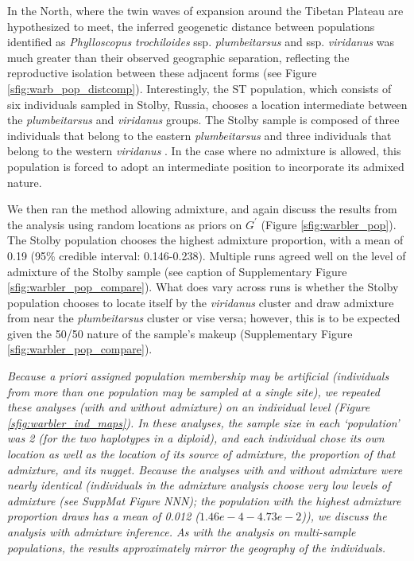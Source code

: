\documentclass[12pt]{article}
\newcommand{\gb}[1]{{\em \color{magenta} #1}}
\begin{document}
In the North, where the twin waves of expansion around the Tibetan Plateau are hypothesized to meet, the inferred geogenetic distance between populations identified as \textit{Phylloscopus trochiloides} ssp. \textit{plumbeitarsus} and ssp. \textit{viridanus} was much greater than their observed geographic separation, reflecting the reproductive isolation between these adjacent forms (see Figure \ref{sfig:warb_pop_distcomp}).  Interestingly, the ST population, which consists of six individuals sampled in Stolby, Russia, chooses a location intermediate between the \textit{plumbeitarsus} and \textit{viridanus} groups. The Stolby sample is composed of three individuals that belong to the eastern \textit{plumbeitarsus} and three individuals that belong to the western \textit{viridanus} \cite{Alcaide et al (2014)}. In the case where no admixture is allowed, this population is forced to adopt an intermediate position to incorporate its admixed nature.


We then ran the method allowing admixture, and again discuss the results from the analysis using random locations as priors on $G^{\prime}$ (Figure \ref{sfig:warbler_pop}). The Stolby population chooses the highest admixture proportion, with a mean of 0.19 (95\% credible interval: 0.146-0.238).  Multiple runs agreed well on the level of admixture of the Stolby sample (see caption of Supplementary Figure \ref{sfig:warbler_pop_compare}). What does vary across runs is whether the Stolby population chooses to locate itself by the \textit{viridanus} cluster and draw admixture from near the \textit{plumbeitarsus}  cluster or vise versa; however, this is to be expected given the 50/50 nature of the sample's makeup (Supplementary Figure \ref{sfig:warbler_pop_compare}).

\gb{Because \textit{a priori} assigned population membership may be artificial (individuals from more than one population may be sampled at a single site), we repeated these analyses (with and without admixture) on an individual level (Figure \ref{sfig:warbler_ind_maps}).  In these analyses, the sample size in each `population' was 2 (for the two haplotypes in a diploid), and each individual chose its own location as well as the location of its source of admixture, the proportion of that admixture, and its nugget.  Because the analyses with and without admixture were nearly identical (individuals in the admixture analysis choose very low levels of admixture (see SuppMat Figure NNN); the population with the highest admixture proportion draws has a mean of 0.012 ($1.46e-4 - 4.73e-2$)), we discuss the analysis with admixture inference.  As with the analysis on multi-sample populations, the results approximately mirror the geography of the individuals.}
\end{document}
